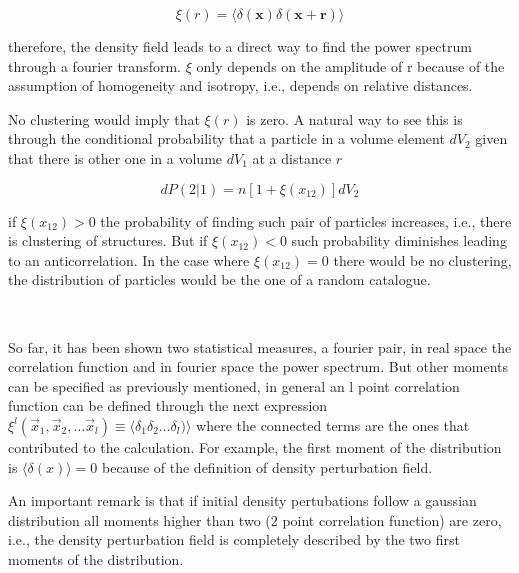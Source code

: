 \[\xi (r) =  \langle  \delta(\textbf{x})\delta(\textbf{x}+\textbf{r}) \rangle\]

therefore, the density field leads to a direct way to find the power spectrum through a fourier 
transform. $\xi$ only depends on the amplitude of r because of the assumption of homogeneity
and isotropy, i.e., depends on relative distances. 

No clustering would imply that $\xi(r)$ is zero. A natural way to see this is through
the conditional probability that a particle in a volume element $dV_2$ given that there 
is other one in a volume $dV_1$ at a distance $r$ 

\[dP(2|1) = n[1+\xi(x_{12})]dV_2\]

if $\xi(x_{12})>0$ the probability of finding such pair of particles increases,
i.e., there is clustering of structures. But if $\xi(x_{12})<0$ such probability 
diminishes leading to an anticorrelation.  In the case where $\xi(x_{12})=0$ 
there would be no clustering, the distribution of particles would be the one of 
a random catalogue. 

\
 
So far, it has been shown two statistical measures, a fourier pair, in real space the 
correlation function and in fourier space the power spectrum. 
But other moments can be specified as previously mentioned, in general an l point 
correlation function can be defined through the next expression 
$\xi^l(\vec{x}_1,\vec{x}_2,\ldots \vec{x}_l) \equiv  \langle  \delta_1\delta_2 \ldots\delta_l)\rangle $ where the connected terms are the ones that contributed to the calculation.
For example, the first moment of the distribution is $\langle \delta(x) \rangle = 0$ because 
of the definition of density perturbation field. 

An important remark is that if initial density pertubations follow a gaussian distribution 
all moments higher than two (2 point correlation function) are zero, i.e., the density
perturbation field is completely described by the two first moments of the distribution. 

\


